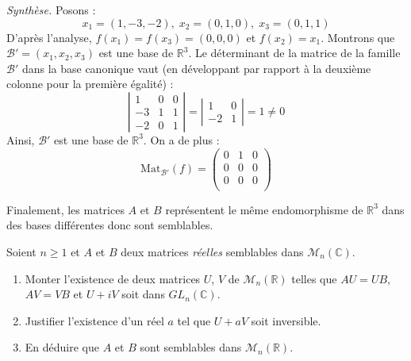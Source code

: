 \documentclass[a4paper,10pt]{report}
\begin{document}
\noindent \textit{Synthèse.} Posons :
$$ x_1 =(1,-3,-2), \; x_2 = (0,1,0), \; x_3= (0,1,1)$$
D'après l'analyse, $f(x_1)=f(x_3)=(0,0,0)$ et $f(x_2)=x_1$. Montrons que $\mathcal{B}'=(x_1,x_2,x_3)$ est une base de $\mathbb{R}^3$. Le déterminant de la matrice de la famille $\mathcal{B}'$ dans la base canonique vaut (en développant par rapport à la deuxième colonne pour la première égalité) :
$$ \left\vert \begin{array}{ccc}
1 & 0 & 0 \\
-3 & 1 & 1 \\
-2 & 0 & 1 
\end{array}\right\vert =  \left\vert \begin{array}{cc} 1 & 0 \\
-2 & 1\end{array}\right\vert =1 \neq 0 $$
Ainsi, $\mathcal{B}'$ est une base de $\mathbb{R}^3$. On a de plus :
$$ \textrm{Mat}_{\mathcal{B}'}(f) = \begin{pmatrix}
0 & 1 & 0 \\
0 & 0 & 0 \\
0 & 0 & 0 \\
\end{pmatrix}$$

\medskip

\noindent Finalement, les matrices $A$ et $B$ représentent le même endomorphisme de $\mathbb{R}^3$ dans des bases différentes donc sont semblables.

\begin{Exercice}{} Soient $n \geq 1$ et $A$ et $B$ deux matrices \textit{réelles} semblables dans $\mathcal{M}_n(\mathbb{C})$.

\begin{enumerate}
\item Monter l'existence de deux matrices $U$, $V$ de $\mathcal{M}_n(\mathbb{R})$ telles que $AU=UB$, $AV=VB$ et $U+iV$ soit dans $GL_n(\mathbb{C})$.
\item Justifier l'existence d'un réel $a$ tel que $U+aV$ soit inversible.
\item En déduire que $A$ et $B$ sont semblables dans $\mathcal{M}_n(\mathbb{R})$.
\end{enumerate}
\end{Exercice} 
\end{document}
